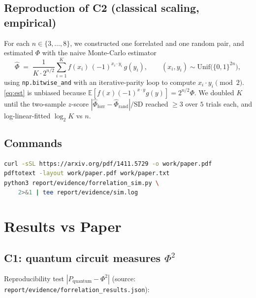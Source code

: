 \documentclass[11pt]{article}
\begin{document}
\subsection{Reproduction of C2 (classical scaling, empirical)}
For each $n \in \{3,\ldots,8\}$, we constructed one forrelated and one
random pair, and estimated $\Phi$ with the naive Monte-Carlo estimator
\begin{equation}
  \widehat{\Phi} \;=\; \frac{1}{K \cdot 2^{n/2}} \sum_{i=1}^{K}
     f(x_i)\, (-1)^{x_i \cdot y_i}\, g(y_i),
     \qquad (x_i, y_i) \sim \mathrm{Unif}\bigl(\{0,1\}^{2n}\bigr),
     \label{eq:est}
\end{equation}
using \texttt{np.bitwise\_and} with an iterative-parity loop to compute
$x_i \cdot y_i \pmod 2$. \eqref{eq:est} is unbiased because
$\mathbb{E}[f(x)(-1)^{x\cdot y}g(y)] = 2^{n/2}\Phi$.
We doubled $K$ until the two-sample $z$-score
$|\widehat{\Phi}_{\mathrm{forr}} - \widehat{\Phi}_{\mathrm{rand}}| / \mathrm{SD}$
reached $\ge 3$ over $5$ trials each, and log-linear-fitted $\log_2 K$ vs $n$.

\subsection{Commands}
\begin{lstlisting}[language=bash]
curl -sSL https://arxiv.org/pdf/1411.5729 -o work/paper.pdf
pdftotext -layout work/paper.pdf work/paper.txt
python3 report/evidence/forrelation_sim.py \
    2>&1 | tee report/evidence/sim.log
\end{lstlisting}

\section{Results vs Paper}

\subsection{C1: quantum circuit measures $\Phi^2$}
Reproducibility test $|P_{\mathrm{quantum}} - \Phi^2|$ (source: \texttt{report/evidence/forrelation\_results.json}):
\end{document}
